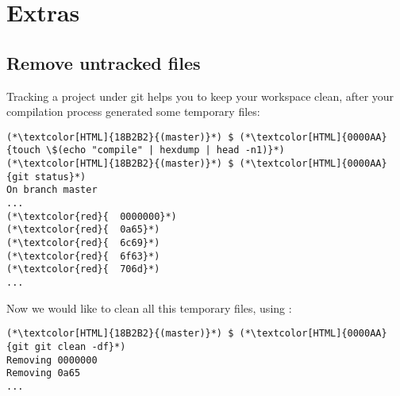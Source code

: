 \section{Extras}
\begin{frame}[fragile]
  \slidetitle
\end{frame}

\subsection{Remove untracked files}
\begin{frame}[fragile]
    \subslidetitle
  Tracking a project under git helps you to keep your workspace clean, after your compilation process generated some temporary files:

  \begin{lstlisting}
(*\textcolor[HTML]{18B2B2}{(master)}*) $ (*\textcolor[HTML]{0000AA}{touch \$(echo "compile" | hexdump | head -n1)}*)
(*\textcolor[HTML]{18B2B2}{(master)}*) $ (*\textcolor[HTML]{0000AA}{git status}*)
On branch master
...
(*\textcolor{red}{	0000000}*)
(*\textcolor{red}{	0a65}*)
(*\textcolor{red}{	6c69}*)
(*\textcolor{red}{	6f63}*)
(*\textcolor{red}{	706d}*)
...
\end{lstlisting}
  Now we would like to clean all this temporary files, using :
  \begin{lstlisting}
(*\textcolor[HTML]{18B2B2}{(master)}*) $ (*\textcolor[HTML]{0000AA}{git git clean -df}*)
Removing 0000000
Removing 0a65
...
\end{lstlisting}

\end{frame}

